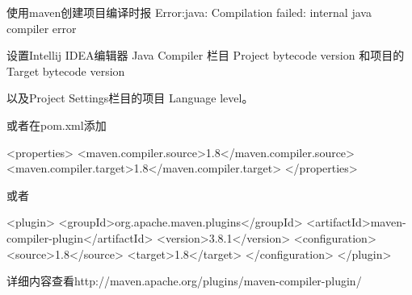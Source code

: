 
使用maven创建项目编译时报 Error:java: Compilation failed: internal java compiler error

设置Intellij IDEA编辑器 Java Compiler 栏目 Project bytecode version 和项目的Target bytecode version 

以及Project Settings栏目的项目 Language level。

或者在pom.xml添加


<properties>
  <maven.compiler.source>1.8</maven.compiler.source>
  <maven.compiler.target>1.8</maven.compiler.target>
</properties>

或者

<plugin>
<groupId>org.apache.maven.plugins</groupId>
<artifactId>maven-compiler-plugin</artifactId>
<version>3.8.1</version>
<configuration>
  <source>1.8</source>
  <target>1.8</target>
</configuration>
</plugin>

详细内容查看http://maven.apache.org/plugins/maven-compiler-plugin/




